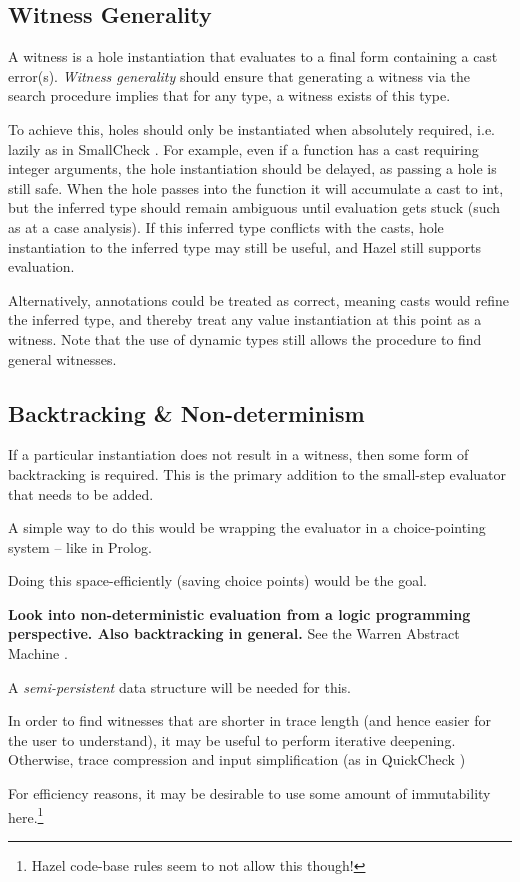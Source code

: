 \subsection{Witness Generality}
A witness is a hole instantiation that evaluates to a final form containing a cast error(s). \textit{Witness generality} should ensure that generating a witness via the search procedure implies that for any type, a witness exists of this type.\par 
To achieve this, holes should only be instantiated when absolutely required, i.e. lazily as in SmallCheck \cite{SmallCheck}. For example, even if a function has a cast requiring integer arguments, the hole instantiation should be delayed, as passing a hole is still safe. When the hole passes into the function it will accumulate a cast to int, but the inferred type should remain ambiguous until evaluation gets stuck (such as at a case analysis). If this inferred type conflicts with the casts, hole instantiation to the inferred type may still be useful, and Hazel still supports evaluation.\par 
Alternatively, annotations could be treated as correct, meaning casts would refine the inferred type, and thereby treat any value instantiation at this point as a witness. Note that the use of dynamic types still allows the procedure to find general witnesses.

\subsection{Backtracking \& Non-determinism}
If a particular instantiation does not result in a witness, then some form of backtracking is required. This is the primary addition to the small-step evaluator that needs to be added.\par 
A simple way to do this would be wrapping the evaluator in a choice-pointing system -- like in Prolog. \par 
Doing this space-efficiently (saving choice points) would be the goal.\par 
\textbf{Look into non-deterministic evaluation from a logic programming perspective. Also backtracking in general.} See the Warren Abstract Machine \cite{WAM}.\par 
A \textit{semi-persistent} data structure \cite{SemiPersistent} will be needed for this.\par 
In order to find witnesses that are shorter in trace length (and hence easier for the user to understand), it may be useful to perform iterative deepening. Otherwise, trace compression and input simplification (as in QuickCheck \cite{QuickCheck})
\par 
For efficiency reasons, it may be desirable to use some amount of immutability here.\footnote{Hazel code-base rules seem to not allow this though!}

